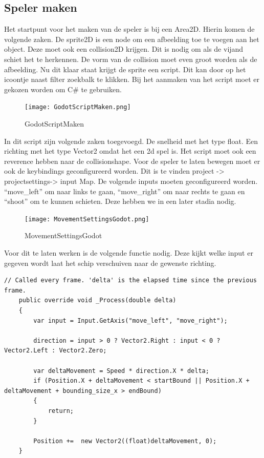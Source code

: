 \subsection{Speler maken}
Het startpunt voor het maken van de speler is bij een Area2D. Hierin komen de volgende zaken. De sprite2D is een node om een afbeelding toe te voegen aan het object. Deze moet ook een collision2D krijgen. Dit is nodig om als de vijand schiet het te herkennen. De vorm van de collision moet even groot worden als de afbeelding. Nu dit klaar staat krijgt de sprite een script. Dit kan door op het icoontje naast filter zoekbalk te klikken. Bij het aanmaken van het script moet er gekozen worden om C\# te gebruiken.
\begin{figure}[H]
    \centering
    \texttt{[image: GodotScriptMaken.png]}
    \caption{GodotScriptMaken}
    \label{fig:GodotScriptMaken}
\end{figure}
In dit script zijn volgende zaken toegevoegd. De snelheid met het type float. Een richting met het type Vector2 omdat het een 2d spel is.  Het script moet ook een reverence hebben naar de collisionshape. Voor de speler te laten bewegen moet er ook de keybindings geconfigureerd worden. Dit is te vinden project -> projectsettings-> input Map. De volgende inputs moeten geconfigureerd worden. “move_left” om naar links te gaan, “move_right” om naar rechts te gaan en “shoot” om te kunnen schieten. Deze hebben we in een later stadia nodig.

\begin{figure}[H]
    \centering
    \texttt{[image: MovementSettingsGodot.png]}
    \caption{MovementSettingsGodot}
    \label{fig:MovementSettingsGodot}
\end{figure}
Voor dit te laten werken is de volgende functie nodig. Deze kijkt welke input er gegeven wordt laat het schip verschuiven naar de gewenste richting.

\begin{lstlisting}[style=csharp]
    // Called every frame. 'delta' is the elapsed time since the previous frame.
    public override void _Process(double delta)
    {
        var input = Input.GetAxis("move_left", "move_right");
        
        direction = input > 0 ? Vector2.Right : input < 0 ? Vector2.Left : Vector2.Zero;
        
        var deltaMovement = Speed * direction.X * delta;
        if (Position.X + deltaMovement < startBound || Position.X + deltaMovement + bounding_size_x > endBound)
        {
            return;
        }
        
        Position +=  new Vector2((float)deltaMovement, 0);
    }    
\end{lstlisting}

